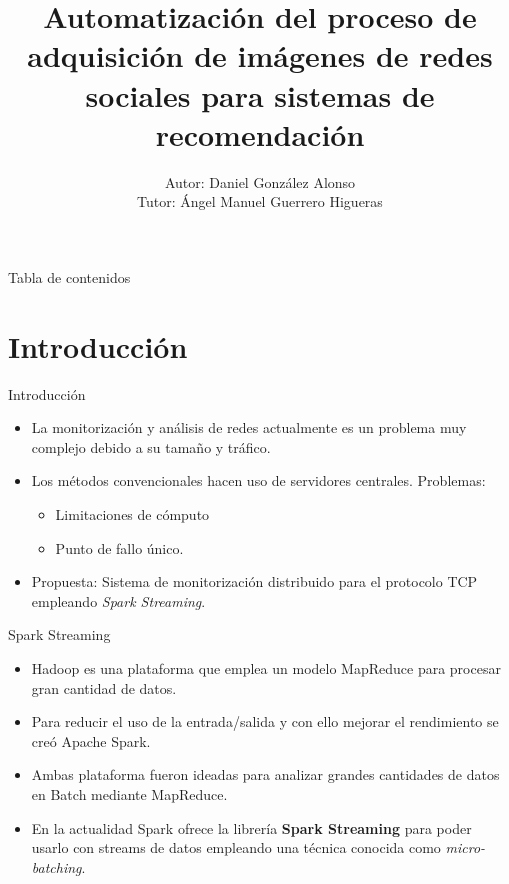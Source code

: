 \documentclass[aspectratio=149]{beamer}
\title[Automatización del proceso de adquisición de imágenes de redes sociales para sistemas de recomendación]{Automatización del proceso de adquisición de imágenes de redes sociales para sistemas de recomendación}
\author[Daniel González Alonso]{
    Autor: Daniel González Alonso\\[1ex] 
    Tutor: Ángel Manuel Guerrero Higueras}
\institute[Universidad de Valladolid]
{
    Máster Universitario en Inteligencia de Negocio \\[-4pt]
    y Big Data en Entornos Seguros
}
\begin{document}
\begin{frame}[label=title, plain]
    \titlepage
\end{frame}

\begin{frame}[label=toc]{Tabla de contenidos}
 \setlength{\leftskip}{5cm}%
 \tableofcontents[subsectionstyle=hide]
\end{frame}

\section{Introducción}
\begin{frame}[label=intro]{Introducción}
    \begin{itemize}
        \item La monitorización y análisis de redes actualmente es un problema muy complejo debido a su tamaño y tráfico.
        \item Los métodos convencionales hacen uso de servidores centrales. Problemas:
        \begin{itemize}
            \item Limitaciones de cómputo
            \item Punto de fallo único.
        \end{itemize}
        \item Propuesta: Sistema de monitorización distribuido para el protocolo TCP empleando \textit{Spark Streaming}.
    \end{itemize}
\end{frame}

\begin{frame}[label=spark_streaming]{Spark Streaming}
    \begin{itemize}
        \item Hadoop es una plataforma que emplea un modelo MapReduce para procesar gran cantidad de datos.
        \item Para reducir el uso de la entrada/salida y con ello mejorar el rendimiento se creó Apache Spark.
        \item Ambas plataforma fueron ideadas para analizar grandes cantidades de datos en Batch mediante MapReduce.
        \item En la actualidad Spark ofrece la librería \textbf{Spark Streaming} para poder usarlo con streams de datos empleando una técnica conocida como \textit{micro-batching}.
    \end{itemize}
\end{frame}
\end{document}
